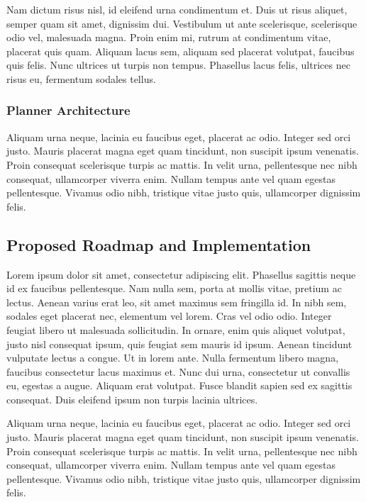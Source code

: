 \documentclass{cta-author}
\begin{document}
Nam dictum risus nisl, id eleifend urna condimentum et. Duis ut risus aliquet, semper quam sit amet, dignissim dui. Vestibulum ut ante scelerisque, scelerisque odio vel, malesuada magna. Proin enim mi, rutrum at condimentum vitae, placerat quis quam. Aliquam lacus sem, aliquam sed placerat volutpat, faucibus quis felis. Nunc ultrices ut turpis non tempus. Phasellus lacus felis, ultrices nec risus eu, fermentum sodales tellus.

\subsubsection{Planner Architecture}


Aliquam urna neque, lacinia eu faucibus eget, placerat ac odio. Integer sed orci justo. Mauris placerat magna eget quam tincidunt, non suscipit ipsum venenatis. Proin consequat scelerisque turpis ac mattis. In velit urna, pellentesque nec nibh consequat, ullamcorper viverra enim. Nullam tempus ante vel quam egestas pellentesque. Vivamus odio nibh, tristique vitae justo quis, ullamcorper dignissim felis.

\subsection{Proposed Roadmap and Implementation}
Lorem ipsum dolor sit amet, consectetur adipiscing elit. Phasellus sagittis neque id ex faucibus pellentesque. Nam nulla sem, porta at mollis vitae, pretium ac lectus. Aenean varius erat leo, sit amet maximus sem fringilla id. In nibh sem, sodales eget placerat nec, elementum vel lorem. Cras vel odio odio. Integer feugiat libero ut malesuada sollicitudin. In ornare, enim quis aliquet volutpat, justo nisl consequat ipsum, quis feugiat sem mauris id ipsum. Aenean tincidunt vulputate lectus a congue. Ut in lorem ante. Nulla fermentum libero magna, faucibus consectetur lacus maximus et. Nunc dui urna, consectetur ut convallis eu, egestas a augue. Aliquam erat volutpat. Fusce blandit sapien sed ex sagittis consequat. Duis eleifend ipsum non turpis lacinia ultrices.

Aliquam urna neque, lacinia eu faucibus eget, placerat ac odio. Integer sed orci justo. Mauris placerat magna eget quam tincidunt, non suscipit ipsum venenatis. Proin consequat scelerisque turpis ac mattis. In velit urna, pellentesque nec nibh consequat, ullamcorper viverra enim. Nullam tempus ante vel quam egestas pellentesque. Vivamus odio nibh, tristique vitae justo quis, ullamcorper dignissim felis.
\end{document}

